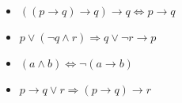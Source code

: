 \begin{enumerate}
\begin{multicols}{2}

  \begin{itemize}
  \item $((p \rightarrow q ) \rightarrow q ) \rightarrow q \Leftrightarrow p \rightarrow q $
  \item $p \vee ( \neg q \wedge r ) \Rightarrow q \vee \neg r \rightarrow p $
  \end{itemize}

\columnbreak

  \begin{itemize}
  \item $(a \wedge b) \Leftrightarrow \neg ( a \rightarrow b )$
  \item $p \rightarrow q \vee r \Rightarrow (p \rightarrow q ) \rightarrow r $
  \end{itemize}

\end{multicols}

\end{enumerate}


